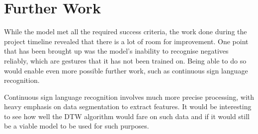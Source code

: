 \documentclass[final,rdr32.tex]{subfiles}
\begin{document}
\section{Further Work}

While the model met all the required success criteria, the work done during the project timeline revealed that there is a lot of room for improvement. One point that has been brought up was the model's inability to recognise negatives reliably, which are gestures that it has not been trained on. Being able to do so would enable even more possible further work, such as continuous sign language recognition.

Continuous sign language recognition involves much more precise processing, with heavy emphasis on data segmentation to extract features. It would be interesting to see how well the DTW algorithm would fare on such data and if it would still be a viable model to be used for such purposes.
\end{document}
